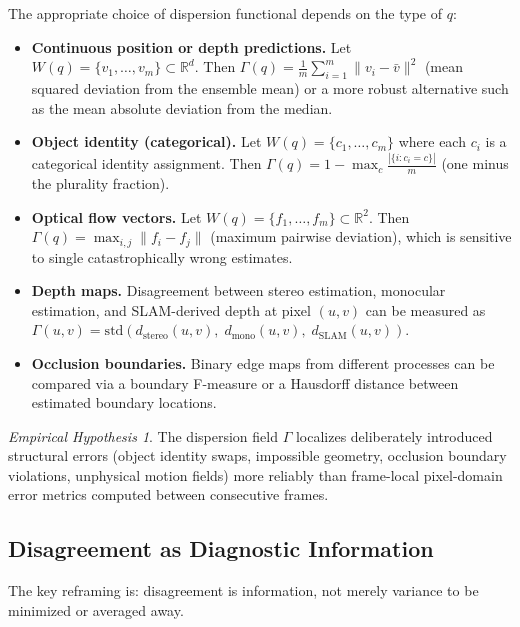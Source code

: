 \documentclass[11pt,a4paper]{article}
\theoremstyle{plain}
\theoremstyle{definition}
\theoremstyle{remark}
\newtheorem{hypothesis}[theorem]{Empirical Hypothesis}
\begin{document}
The appropriate choice of dispersion functional depends on the type of $q$:

\begin{itemize}[leftmargin=2em,itemsep=2pt]
\item \textbf{Continuous position or depth predictions.} Let $W(q) = \{v_1, \ldots, v_m\} \subset \mathbb{R}^d$. Then $\Gamma(q) = \frac{1}{m}\sum_{i=1}^m \|v_i - \bar{v}\|^2$ (mean squared deviation from the ensemble mean) or a more robust alternative such as the mean absolute deviation from the median.

\item \textbf{Object identity (categorical).} Let $W(q) = \{c_1, \ldots, c_m\}$ where each $c_i$ is a categorical identity assignment. Then $\Gamma(q) = 1 - \max_c \frac{|\{i : c_i = c\}|}{m}$ (one minus the plurality fraction).

\item \textbf{Optical flow vectors.} Let $W(q) = \{f_1, \ldots, f_m\} \subset \mathbb{R}^2$. Then $\Gamma(q) = \max_{i,j} \|f_i - f_j\|$ (maximum pairwise deviation), which is sensitive to single catastrophically wrong estimates.

\item \textbf{Depth maps.} Disagreement between stereo estimation, monocular estimation, and SLAM-derived depth at pixel $(u,v)$ can be measured as $\Gamma(u,v) = \mathrm{std}(d_{\text{stereo}}(u,v),\; d_{\text{mono}}(u,v),\; d_{\text{SLAM}}(u,v))$.

\item \textbf{Occlusion boundaries.} Binary edge maps from different processes can be compared via a boundary F-measure or a Hausdorff distance between estimated boundary locations.
\end{itemize}

\begin{hypothesis}
\label{hyp:gamma}
The dispersion field $\Gamma$ localizes deliberately introduced structural errors (object identity swaps, impossible geometry, occlusion boundary violations, unphysical motion fields) more reliably than frame-local pixel-domain error metrics computed between consecutive frames.
\end{hypothesis}

\subsection{Disagreement as Diagnostic Information}

The key reframing is: disagreement is information, not merely variance to be minimized or averaged away.
\end{document}
